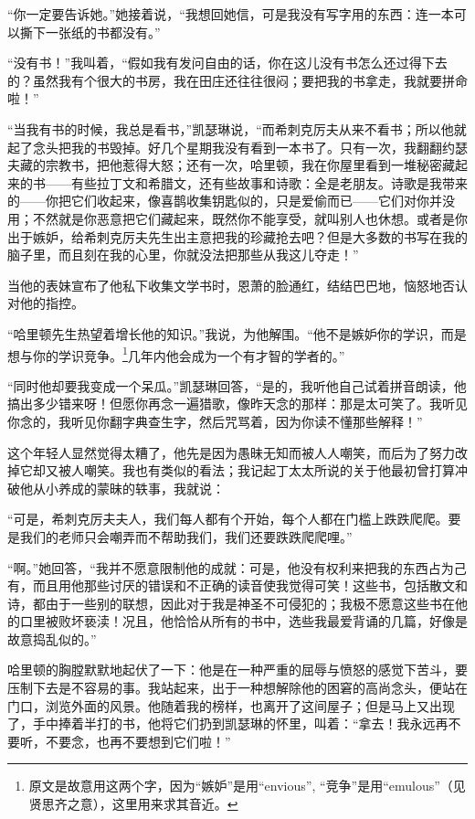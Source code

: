 \par “你一定要告诉她。”她接着说，“我想回她信，可是我没有写字用的东西：连一本可以撕下一张纸的书都没有。”
\par “没有书！”我叫着，“假如我有发问自由的话，你在这儿没有书怎么还过得下去的？虽然我有个很大的书房，我在田庄还往往很闷；要把我的书拿走，我就要拼命啦！”
\par “当我有书的时候，我总是看书，”凯瑟琳说，“而希刺克厉夫从来不看书；所以他就起了念头把我的书毁掉。好几个星期我没有看到一本书了。只有一次，我翻翻约瑟夫藏的宗教书，把他惹得大怒；还有一次，哈里顿，我在你屋里看到一堆秘密藏起来的书——有些拉丁文和希腊文，还有些故事和诗歌：全是老朋友。诗歌是我带来的——你把它们收起来，像喜鹊收集钥匙似的，只是爱偷而已——它们对你并没用；不然就是你恶意把它们藏起来，既然你不能享受，就叫别人也休想。或者是你出于嫉妒，给希刺克厉夫先生出主意把我的珍藏抢去吧？但是大多数的书写在我的脑子里，而且刻在我的心里，你就没法把那些从我这儿夺走！”
\par 当他的表妹宣布了他私下收集文学书时，恩萧的脸通红，结结巴巴地，恼怒地否认对他的指控。
\par “哈里顿先生热望着增长他的知识。”我说，为他解围。“他不是嫉妒你的学识，而是想与你的学识竞争。\footnote{原文是故意用这两个字，因为“嫉妒”是用“envious”, “竞争”是用“emulous”（见贤思齐之意），这里用来求其音近。}几年内他会成为一个有才智的学者的。”
\par “同时他却要我变成一个呆瓜。”凯瑟琳回答，“是的，我听他自己试着拼音朗读，他搞出多少错来呀！但愿你再念一遍猎歌，像昨天念的那样：那是太可笑了。我听见你念的，我听见你翻字典查生字，然后咒骂着，因为你读不懂那些解释！”
\par 这个年轻人显然觉得太糟了，他先是因为愚昧无知而被人人嘲笑，而后为了努力改掉它却又被人嘲笑。我也有类似的看法；我记起丁太太所说的关于他最初曾打算冲破他从小养成的蒙昧的轶事，我就说：
\par “可是，希刺克厉夫夫人，我们每人都有个开始，每个人都在门槛上跌跌爬爬。要是我们的老师只会嘲弄而不帮助我们，我们还要跌跌爬爬哩。”
\par “啊。”她回答，“我并不愿意限制他的成就：可是，他没有权利来把我的东西占为己有，而且用他那些讨厌的错误和不正确的读音使我觉得可笑！这些书，包括散文和诗，都由于一些别的联想，因此对于我是神圣不可侵犯的；我极不愿意这些书在他的口里被败坏亵渎！况且，他恰恰从所有的书中，选些我最爱背诵的几篇，好像是故意捣乱似的。”
\par 哈里顿的胸膛默默地起伏了一下：他是在一种严重的屈辱与愤怒的感觉下苦斗，要压制下去是不容易的事。我站起来，出于一种想解除他的困窘的高尚念头，便站在门口，浏览外面的风景。他随着我的榜样，也离开了这间屋子；但是马上又出现了，手中捧着半打的书，他将它们扔到凯瑟琳的怀里，叫着：“拿去！我永远再不要听，不要念，也再不要想到它们啦！”
